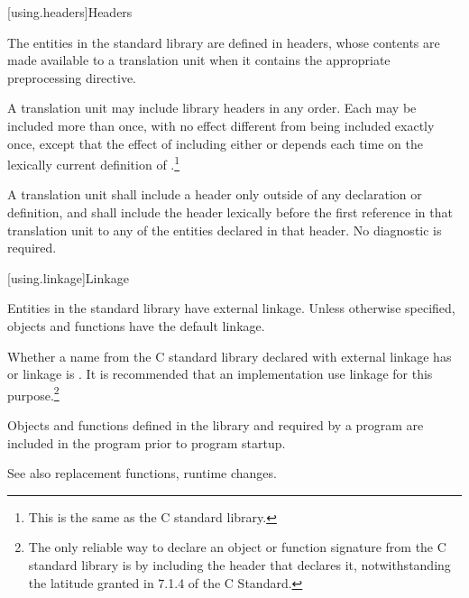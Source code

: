 [using.headers]{Headers}

\pnum
The entities in the \Cpp{} standard library are defined in headers,
whose contents are made available to a translation unit when it contains the appropriate
%
preprocessing directive.%
%

\pnum
A translation unit may include library headers in any order.
%
Each may be included more than once, with no effect different from
being included exactly once, except that the effect of including either
or
depends each time on the lexically
%
%
current definition of
%
%
.\footnote{This is the same as the C standard library.}

\pnum
A translation unit shall include a header only outside of any
%
declaration or definition, and shall include the header lexically
before the first reference in that translation unit to any of the entities
declared in that header. No diagnostic is required.

[using.linkage]{Linkage}

\pnum
Entities in the \Cpp{} standard library have external linkage.
Unless otherwise specified, objects and functions have the default
linkage.

\pnum
{}%
Whether a name from the C standard library declared with
external linkage has
%
%
%
or
%
linkage is . It is recommended that an
implementation use
linkage for this purpose.\footnote{The only reliable way to declare an object or
function signature from the C standard library is by including the header that
declares it, notwithstanding the latitude granted in 7.1.4 of the C
Standard.}

\pnum
Objects and functions
defined in the library and required by a \Cpp{} program are included in
the program prior to program startup.

%
\pnum
See also
replacement functions,
runtime changes.


